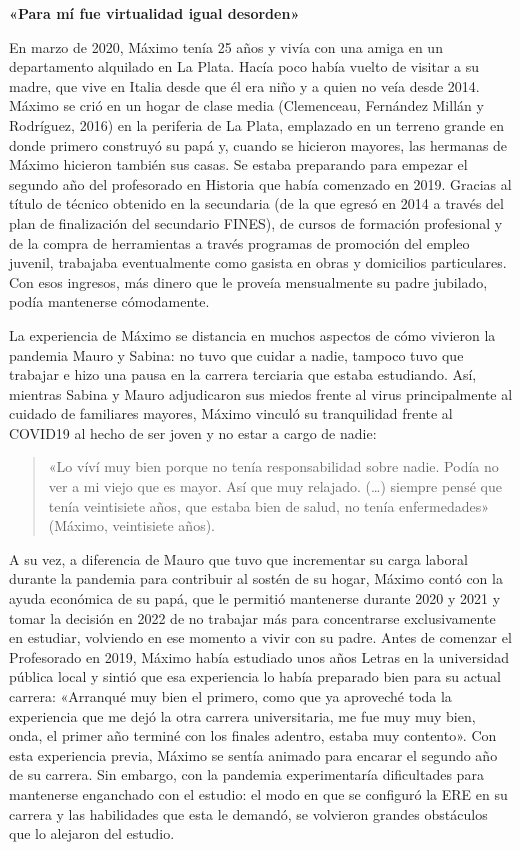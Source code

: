 \textbf{«Para mí fue virtualidad igual desorden»}

En marzo de 2020, Máximo tenía 25 años y vivía con una amiga en un departamento alquilado en La Plata. Hacía poco había vuelto de visitar a su madre, que vive en Italia desde que él era niño y a quien no veía desde 2014. Máximo se crió en un hogar de clase media (Clemenceau, Fernández Millán y Rodríguez, 2016) en la periferia de La Plata, emplazado en un terreno grande en donde primero construyó su papá y, cuando se hicieron mayores, las hermanas de Máximo hicieron también sus casas. Se estaba preparando para empezar el segundo año del profesorado en Historia que había comenzado en 2019. Gracias al título de técnico obtenido en la secundaria (de la que egresó en 2014 a través del plan de finalización del secundario FINES), de cursos de formación profesional y de la compra de herramientas a través programas de promoción del empleo juvenil, trabajaba eventualmente como gasista en obras y domicilios particulares. Con esos ingresos, más dinero que le proveía mensualmente su padre jubilado, podía mantenerse cómodamente.

La experiencia de Máximo se distancia en muchos aspectos de cómo vivieron la pandemia Mauro y Sabina: no tuvo que cuidar a nadie, tampoco tuvo que trabajar e hizo una pausa en la carrera terciaria que estaba estudiando. Así, mientras Sabina y Mauro adjudicaron sus miedos frente al virus principalmente al cuidado de familiares mayores, Máximo vinculó su tranquilidad frente al COVID19 al hecho de ser joven y no estar a cargo de nadie:

\begin{quote}
«Lo víví muy bien porque no tenía responsabilidad sobre nadie. Podía no ver a mi viejo que es mayor. Así que muy relajado. (\ldots) siempre pensé que tenía veintisiete años, que estaba bien de salud, no tenía enfermedades» (Máximo, veintisiete años).
\end{quote}

A su vez, a diferencia de Mauro que tuvo que incrementar su carga laboral durante la pandemia para contribuir al sostén de su hogar, Máximo contó con la ayuda económica de su papá, que le permitió mantenerse durante 2020 y 2021 y tomar la decisión en 2022 de no trabajar más para concentrarse exclusivamente en estudiar, volviendo en ese momento a vivir con su padre. Antes de comenzar el Profesorado en 2019, Máximo había estudiado unos años Letras en la universidad pública local y sintió que esa experiencia lo había preparado bien para su actual carrera: «Arranqué muy bien el primero, como que ya aproveché toda la experiencia que me dejó la otra carrera universitaria, me fue muy muy bien, onda, el primer año terminé con los finales adentro, estaba muy contento». Con esta experiencia previa, Máximo se sentía animado para encarar el segundo año de su carrera. Sin embargo, con la pandemia experimentaría dificultades para mantenerse enganchado con el estudio: el modo en que se configuró la ERE en su carrera y las habilidades que esta le demandó, se volvieron grandes obstáculos que lo alejaron del estudio.

